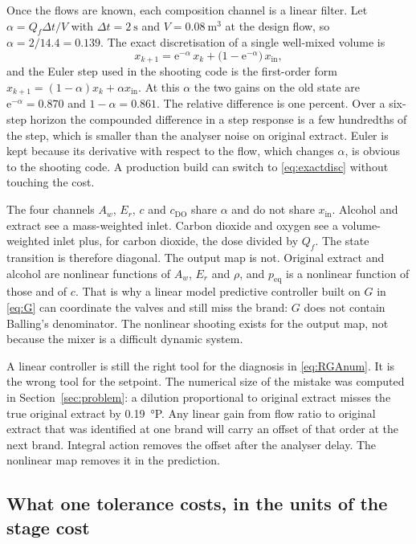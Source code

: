 Once the flows are known, each composition channel is a linear filter. Let $\alpha = Q_f\Delta t/V$ with $\Delta t=\SI{2}{\second}$ and $V=\SI{0.08}{\cubic\metre}$ at the design flow, so $\alpha = 2/14.4 = 0.139$. The exact discretisation of a single well-mixed volume is
\begin{equation}
\label{eq:exactdisc}
x_{k+1} = \mathrm{e}^{-\alpha}\,x_k + \big(1-\mathrm{e}^{-\alpha}\big)\,x_{\mathrm{in}},
\end{equation}
and the Euler step used in the shooting code is the first-order form $x_{k+1}=(1-\alpha)x_k+\alpha x_{\mathrm{in}}$. At this $\alpha$ the two gains on the old state are $\mathrm{e}^{-\alpha}=0.870$ and $1-\alpha=0.861$. The relative difference is one percent. Over a six-step horizon the compounded difference in a step response is a few hundredths of the step, which is smaller than the analyser noise on original extract. Euler is kept because its derivative with respect to the flow, which changes $\alpha$, is obvious to the shooting code. A production build can switch to \eqref{eq:exactdisc} without touching the cost.

The four channels $A_w$, $E_r$, $c$ and $c_{\mathrm{DO}}$ share $\alpha$ and do not share $x_{\mathrm{in}}$. Alcohol and extract see a mass-weighted inlet. Carbon dioxide and oxygen see a volume-weighted inlet plus, for carbon dioxide, the dose divided by $Q_f$. The state transition is therefore diagonal. The output map is not. Original extract and alcohol are nonlinear functions of $A_w$, $E_r$ and $\rho$, and $p_{\mathrm{eq}}$ is a nonlinear function of those and of $c$. That is why a linear model predictive controller built on $G$ in \eqref{eq:G} can coordinate the valves and still miss the brand: $G$ does not contain Balling's denominator. The nonlinear shooting exists for the output map, not because the mixer is a difficult dynamic system.

A linear controller is still the right tool for the diagnosis in \eqref{eq:RGAnum}. It is the wrong tool for the setpoint. The numerical size of the mistake was computed in Section~\ref{sec:problem}: a dilution proportional to original extract misses the true original extract by \SI{0.19}{\degree}P. Any linear gain from flow ratio to original extract that was identified at one brand will carry an offset of that order at the next brand. Integral action removes the offset after the analyser delay. The nonlinear map removes it in the prediction.

\subsection{What one tolerance costs, in the units of the stage cost}
\label{sec:weights}

